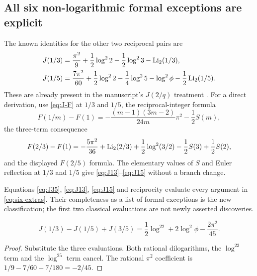 \subsection{All six non-logarithmic formal exceptions are explicit}

The known identities for the other two reciprocal pairs are
\begin{align}
 J(1/3)&=\frac{\pi^2}{9}+\frac12\log^22-\frac12\log^23-\operatorname{Li}_2(1/3),
 \label{eq:J13}\\
 J(1/5)&=\frac{7\pi^2}{60}+\frac12\log^22-\frac14\log^25
                  -\log^2\phi-\frac12\operatorname{Li}_2(1/5).
 \label{eq:J15}
\end{align}
These are already present in the manuscript's $J(2/q)$ treatment
\cite{Repo}. For a direct derivation, use \eqref{eq:J-F} at $1/3$ and
$1/5$, the reciprocal-integer formula
\[
 F(1/m)-F(1)=-\frac{(m-1)(3m-2)}{24m}\pi^2-\frac12S(m),
\]
the three-term consequence
\[
 F(2/3)-F(1)=-\frac{5\pi^2}{36}+\operatorname{Li}_2(2/3)
                  +\frac12\log^2(3/2)-\frac12S(3)+\frac12S(2),
\]
and the displayed $F(2/5)$ formula. The elementary values of $S$ and
Euler reflection at $1/3$ and $1/5$ give
\eqref{eq:J13}--\eqref{eq:J15} without a branch change.

Equations \eqref{eq:J35}, \eqref{eq:J13}, \eqref{eq:J15} and
reciprocity evaluate every argument in \eqref{eq:six-extras}. Their
completeness as a list of formal exceptions is the new classification;
the first two classical evaluations are not newly asserted discoveries.

\begin{corollary}
\label{cor:exceptional-relation}
\begin{equation}\label{eq:exceptional-relation}
 \boxed{\quad J(1/3)-J(1/5)+J(3/5)
      =\frac12\log^22+2\log^2\phi-\frac{2\pi^2}{45}.\quad}
\end{equation}
\end{corollary}
\begin{proof}
Substitute the three evaluations. Both rational dilogarithms, the
$\log^23$ term and the $\log^25$ term cancel. The rational
$\pi^2$ coefficient is $1/9-7/60-7/180=-2/45$.
\end{proof}
